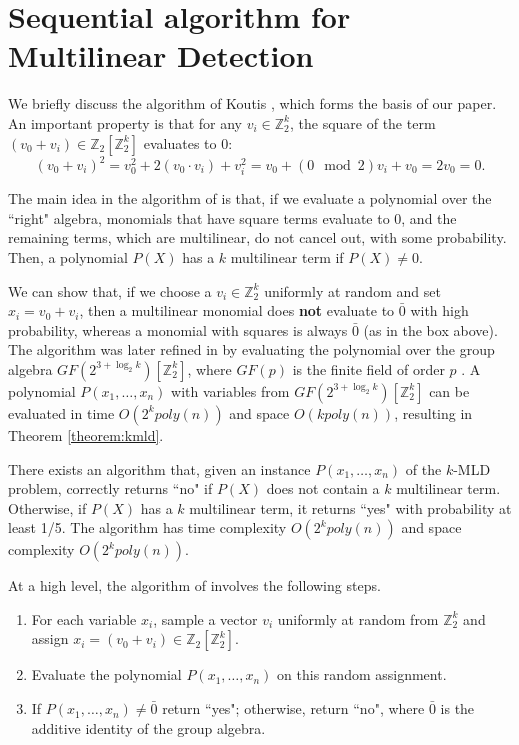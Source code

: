 \section{Sequential algorithm for Multilinear Detection} 
\label{sec:seq}
We briefly discuss the algorithm of Koutis \cite{koutis:icalp08}, which forms the basis of our paper. An important property is that for any $v_i \in \mathbb{Z}_2^k$, the square of the term $(v_0 + v_i) \in \mathbb{Z}_2[\mathbb{Z}_2^k]$ evaluates to 0:
{\small
$$
(v_0 + v_i)^2 = v_0^2 + 2(v_0\cdot v_i) + v_i^2 = v_0 + (0\mod 2)v_i + v_0 = 2v_0 = 0.
$$}

The main idea in the algorithm of \cite{koutis:icalp08} is that, if we evaluate a polynomial 
over the ``right" algebra, monomials that have square terms evaluate to 0, and the remaining terms,
which are multilinear, do not cancel out, with some probability.
Then, a polynomial $P(X)$ has a $k$ multilinear term if $P(X) \neq 0$. 

We can show that, if we choose a $v_i \in \mathbb{Z}_2^k$ uniformly at random and set $x_i = v_0 + v_i$, then a multilinear monomial does \textbf{not} evaluate to $\bar 0$ with high probability, whereas a monomial with squares is always $\bar 0$ (as in the box above).
The algorithm was later refined in \cite{williams2009finding} by evaluating the polynomial over the group algebra $GF(2^{3 + \log_2k})[\mathbb{Z}_2^k]$, where $GF(p)$ is the finite field of order $p$ \cite{mullen2007finite}. A polynomial $P(x_1,\ldots,x_n)$ with variables from $GF(2^{3 + \log_2k})[\mathbb{Z}_2^k]$ can be evaluated in time $O(2^k poly(n))$ and space $O(kpoly(n))$, resulting in Theorem \ref{theorem:kmld}.

\begin{theorem}
\label{theorem:kmld}
There exists an algorithm that, given an instance $P(x_1,\ldots,x_n)$ of the \textsc{$k$-MLD} problem, correctly returns ``no" if $P(X)$ does not contain a $k$ multilinear term. Otherwise, if $P(X)$ has a $k$ multilinear term, it returns ``yes" with probability at least 1/5. 
The algorithm has time complexity $O(2^k poly(n))$ and space complexity $O(2^k poly(n))$.
\end{theorem}

At a high level, the algorithm of \cite{koutis:icalp08} involves the following steps.
\begin{enumerate}
\item For each variable $x_i$, sample a vector $v_i$ uniformly at random from $\mathbb{Z}_2^k$ and assign $x_i = (v_0 + v_i) \in \mathbb{Z}_2[\mathbb{Z}_2^k]$.
\item Evaluate the polynomial $P(x_1,\ldots,x_n)$ on this random assignment.
\item If $P(x_1,\ldots,x_n) \neq \bar{0}$ return ``yes"; otherwise, return ``no",
where $\bar{0}$ is the additive identity of the group algebra.
\end{enumerate}

